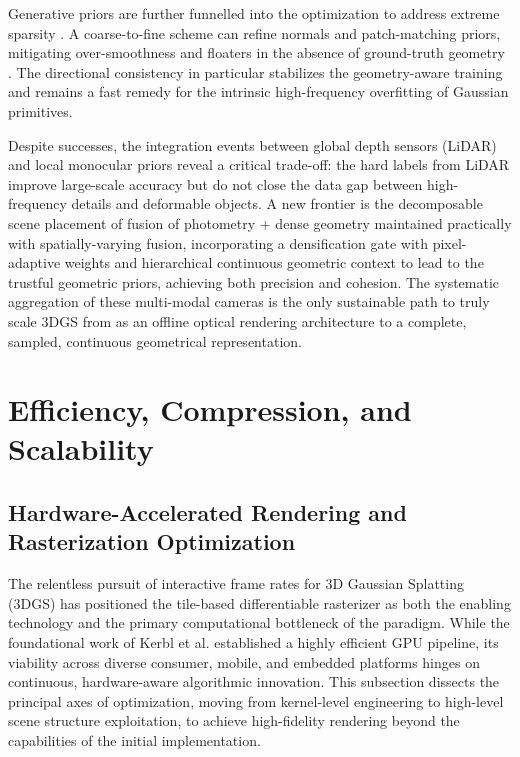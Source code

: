 \documentclass[11pt,a4paper]{article}
\begin{document}
Generative priors are further funnelled into the optimization to address extreme sparsity \cite{arxiv:2402.14650v1}. A coarse-to-fine scheme can refine normals and patch-matching priors, mitigating over-smoothness and floaters in the absence of ground-truth geometry \cite{arxiv:2404.17774v2,arxiv:2406.06521v1}. The directional consistency in particular stabilizes the geometry-aware training and remains a fast remedy for the intrinsic high-frequency overfitting of Gaussian primitives.

Despite successes, the integration events between global depth sensors (LiDAR) and local monocular priors reveal a critical trade-off: the hard labels from LiDAR improve large-scale accuracy but do not close the data gap between high-frequency details and deformable objects. A new frontier is the decomposable scene placement of fusion of photometry + dense geometry maintained practically with spatially-varying fusion, incorporating a densification gate with pixel-adaptive weights and hierarchical continuous geometric context to lead to the trustful geometric priors, achieving both precision and cohesion. The systematic aggregation of these multi-modal cameras is the only sustainable path to truly scale 3DGS from as an offline optical rendering architecture to a complete, sampled, continuous geometrical representation.


\section{Efficiency, Compression, and Scalability}



\subsection{Hardware-Accelerated Rendering and Rasterization Optimization}


The relentless pursuit of interactive frame rates for 3D Gaussian Splatting (3DGS) has positioned the tile-based differentiable rasterizer as both the enabling technology and the primary computational bottleneck of the paradigm. While the foundational work of Kerbl et al. \cite{arxiv:2308.04079v1} established a highly efficient GPU pipeline, its viability across diverse consumer, mobile, and embedded platforms hinges on continuous, hardware-aware algorithmic innovation. This subsection dissects the principal axes of optimization, moving from kernel-level engineering to high-level scene structure exploitation, to achieve high-fidelity rendering beyond the capabilities of the initial implementation.
\end{document}
